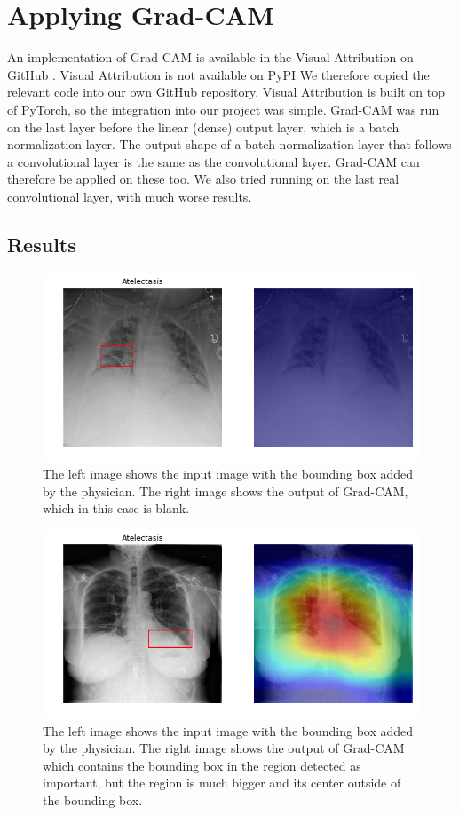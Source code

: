 \section{Applying Grad-CAM}

An implementation of Grad-CAM is available in the Visual Attribution on GitHub \cite{visualattribution}. Visual Attribution is not available on PyPI We therefore copied the relevant code into our own GitHub repository. Visual Attribution is built on top of PyTorch, so the integration into our project was simple. Grad-CAM was run on the last layer before the linear (dense) output layer, which is a batch normalization layer. The output shape of a batch normalization layer that follows a convolutional layer is the same as the convolutional layer. Grad-CAM can therefore be applied on these too. We also tried running on the last real convolutional layer, with much worse results.

\subsection{Results}
\begin{figure}[H]
\centering
\includegraphics[width=12cm]{chapters/03_classification/images/grad-cam_0.png}
\caption{The left image shows the input image with the bounding box added by the physician. The right image shows the output of Grad-CAM, which in this case is blank.}
\label{grad_cam_example_1}
\end{figure}

\begin{figure}[H]
\centering
\includegraphics[width=12cm]{chapters/03_classification/images/grad-cam_2.png}
\caption{The left image shows the input image with the bounding box added by the physician. The right image shows the output of Grad-CAM which contains the bounding box in the region detected as important, but the region is much bigger and its center outside of the bounding box.}
\label{grad_cam_example_2}
\end{figure}

